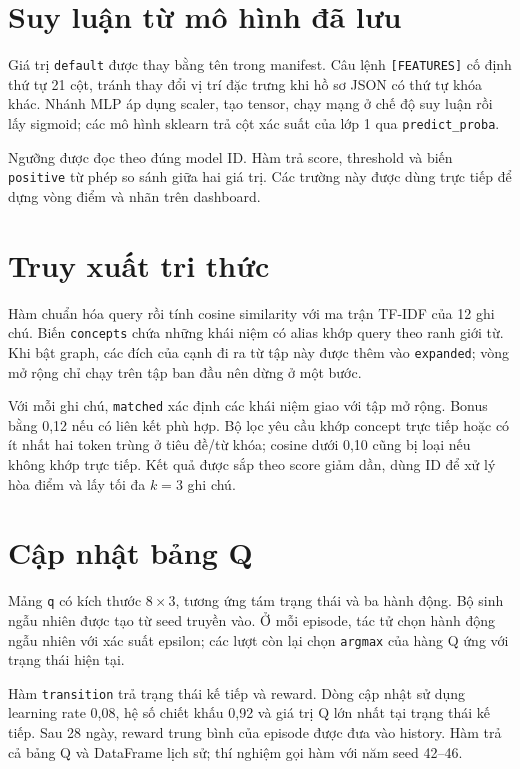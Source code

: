 \section{Suy luận từ mô hình đã lưu}

Giá trị \texttt{default} được thay bằng tên trong manifest. Câu lệnh \texttt{[FEATURES]} cố định thứ tự 21 cột, tránh thay đổi vị trí đặc trưng khi hồ sơ JSON có thứ tự khóa khác. Nhánh MLP áp dụng scaler, tạo tensor, chạy mạng ở chế độ suy luận rồi lấy sigmoid; các mô hình sklearn trả cột xác suất của lớp 1 qua \texttt{predict\_proba}.

Ngưỡng được đọc theo đúng model ID. Hàm trả score, threshold và biến \texttt{positive} từ phép so sánh giữa hai giá trị. Các trường này được dùng trực tiếp để dựng vòng điểm và nhãn trên dashboard.

\section{Truy xuất tri thức}

Hàm chuẩn hóa query rồi tính cosine similarity với ma trận TF-IDF của 12 ghi chú. Biến \texttt{concepts} chứa những khái niệm có alias khớp query theo ranh giới từ. Khi bật graph, các đích của cạnh đi ra từ tập này được thêm vào \texttt{expanded}; vòng mở rộng chỉ chạy trên tập ban đầu nên dừng ở một bước.

Với mỗi ghi chú, \texttt{matched} xác định các khái niệm giao với tập mở rộng. Bonus bằng 0,12 nếu có liên kết phù hợp. Bộ lọc yêu cầu khớp concept trực tiếp hoặc có ít nhất hai token trùng ở tiêu đề/từ khóa; cosine dưới 0,10 cũng bị loại nếu không khớp trực tiếp. Kết quả được sắp theo score giảm dần, dùng ID để xử lý hòa điểm và lấy tối đa $k=3$ ghi chú.

\section{Cập nhật bảng Q}

Mảng \texttt{q} có kích thước $8\times3$, tương ứng tám trạng thái và ba hành động. Bộ sinh ngẫu nhiên được tạo từ seed truyền vào. Ở mỗi episode, tác tử chọn hành động ngẫu nhiên với xác suất epsilon; các lượt còn lại chọn \texttt{argmax} của hàng Q ứng với trạng thái hiện tại.

Hàm \texttt{transition} trả trạng thái kế tiếp và reward. Dòng cập nhật sử dụng learning rate 0,08, hệ số chiết khấu 0,92 và giá trị Q lớn nhất tại trạng thái kế tiếp. Sau 28 ngày, reward trung bình của episode được đưa vào history. Hàm trả cả bảng Q và DataFrame lịch sử; thí nghiệm gọi hàm với năm seed 42--46.


